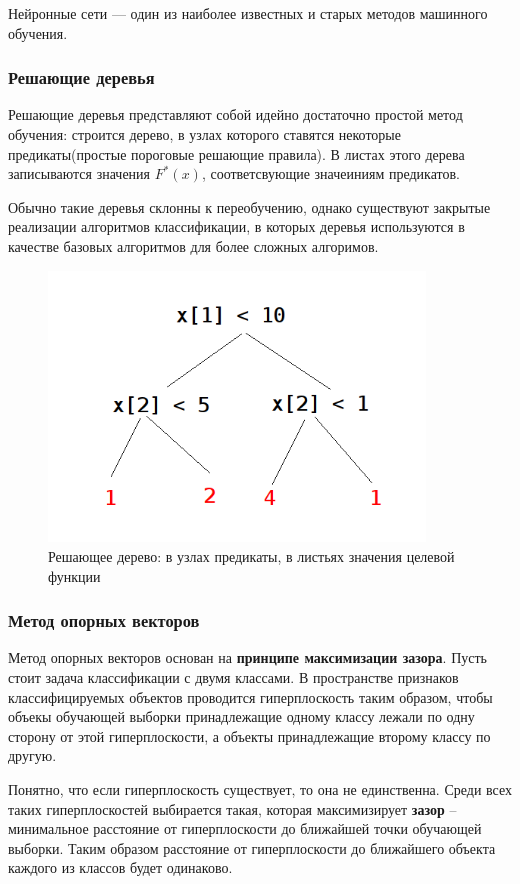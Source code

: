 Нейронные сети — один из наиболее известных и старых методов машинного обучения.

\subsubsection{Решающие деревья}
Решающие деревья представляют собой идейно достаточно простой метод обучения: строится дерево, в узлах которого ставятся некоторые предикаты(простые пороговые решающие правила). В листах этого дерева записываются значения $F^*(x)$, соответсвующие значеиниям предикатов.

Обычно такие деревья склонны к переобучению, однако существуют закрытые реализации алгоритмов классификации, в которых деревья используются в качестве базовых алгоритмов для более сложных алгоримов.
\begin{figure}[h]
\begin{center}
\includegraphics[width=10cm]{img/d_tree}
\end{center}
\caption{Решающее дерево: в узлах предикаты, в листьях значения целевой функции}
\label{d_tree}
\end{figure}

\subsubsection{Метод опорных векторов}
Метод опорных векторов основан на \textbf{принципе максимизации зазора}. Пусть стоит задача классификации с двумя классами. В пространстве признаков классифицируемых объектов проводится гиперплоскость таким образом, чтобы объекы обучающей выборки принадлежащие одному классу лежали по одну сторону от этой гиперплоскости, а объекты принадлежащие второму классу по другую.

Понятно, что если гиперплоскость существует, то она не единственна. Среди всех таких гиперплоскостей выбирается такая, которая максимизирует \textbf{зазор} -- минимальное расстояние от гиперплоскости до ближайшей точки обучающей выборки. Таким образом расстояние от гиперплоскости до ближайшего объекта каждого из классов будет одинаково.

